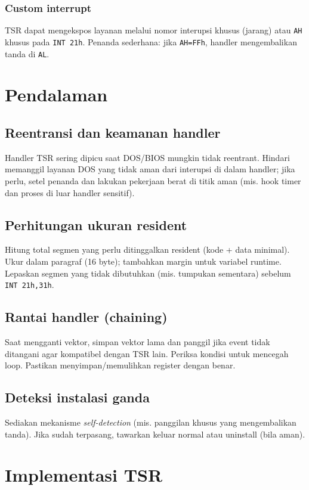 \subsubsection{Custom interrupt}
TSR dapat mengekspos layanan melalui nomor interupsi khusus (jarang) atau \texttt{AH} khusus pada \texttt{INT 21h}. Penanda sederhana: jika \texttt{AH=FFh}, handler mengembalikan tanda di \texttt{AL}.

\section{Pendalaman}\label{sec:tsr-pendalaman}
\subsection{Reentransi dan keamanan handler}
Handler TSR sering dipicu saat DOS/BIOS mungkin tidak reentrant. Hindari memanggil layanan DOS yang tidak aman dari interupsi di dalam handler; jika perlu, setel penanda dan lakukan pekerjaan berat di titik aman (mis. hook timer dan proses di luar handler sensitif). \cite{rbil}

\subsection{Perhitungan ukuran resident}
Hitung total segmen yang perlu ditinggalkan resident (kode + data minimal). Ukur dalam paragraf (16 byte); tambahkan margin untuk variabel runtime. Lepaskan segmen yang tidak dibutuhkan (mis. tumpukan sementara) sebelum \texttt{INT 21h,31h}. \cite{rbil}

\subsection{Rantai handler (chaining)}
Saat mengganti vektor, simpan vektor lama dan panggil jika event tidak ditangani agar kompatibel dengan TSR lain. Periksa kondisi untuk mencegah loop. Pastikan menyimpan/memulihkan register dengan benar. \cite{rbil}

\subsection{Deteksi instalasi ganda}
Sediakan mekanisme \textit{self-detection} (mis. panggilan khusus yang mengembalikan tanda). Jika sudah terpasang, tawarkan keluar normal atau uninstall (bila aman). \cite{rbil}

\section{Implementasi TSR}
